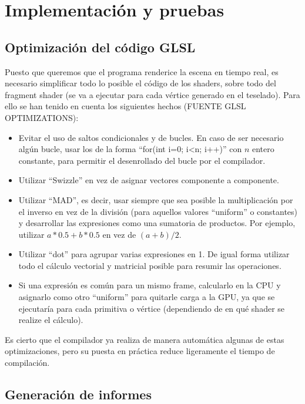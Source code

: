 
\chapter{Implementación y pruebas}


\section{Optimización del código GLSL}
	Puesto que queremos que el programa renderice la escena en tiempo real, es necesario simplificar todo lo posible el código de los shaders, sobre todo del fragment shader (se va a ejecutar para cada vértice generado en el teselado). Para ello se han tenido en cuenta los siguientes hechos (FUENTE GLSL OPTIMIZATIONS):
	\begin{itemize}
		\item Evitar el uso de saltos condicionales y de bucles. En caso de ser necesario algún bucle, usar los de la forma ``for(int i=$0$; i<n; i++)'' con $n$ entero constante, para permitir el desenrollado del bucle por el compilador.
		\item Utilizar ``Swizzle'' en vez de asignar vectores componente a componente.
		\item Utilizar ``MAD'', es decir, usar siempre que sea posible la multiplicación por el inverso en vez de la división (para aquellos valores ``uniform'' o constantes) y desarrollar las expresiones como una sumatoria de productos. Por ejemplo, utilizar $a*0.5 + b*0.5$ en vez de $(a+b)/2$.
		\item Utilizar ``dot'' para agrupar varias expresiones en 1. De igual forma utilizar todo el cálculo vectorial y matricial posible para resumir las operaciones.
		\item Si una expresión es común para un mismo frame, calcularlo en la CPU y asignarlo como otro ``uniform'' para quitarle carga a la GPU, ya que se ejecutaría para cada primitiva o vértice (dependiendo de en qué shader se realize el cálculo).
	\end{itemize}
	
	Es cierto que el compilador ya realiza de manera automática algunas de estas optimizaciones, pero su puesta en práctica reduce ligeramente el tiempo de compilación.

\section{Generación de informes}

